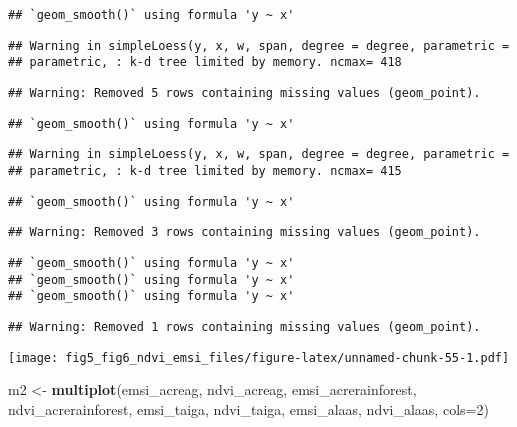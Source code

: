 \documentclass[
]{article}
\newenvironment{Shaded}{\begin{snugshade}}{\end{snugshade}}
\newcommand{\DataTypeTok}[1]{\textcolor[rgb]{0.13,0.29,0.53}{#1}}
\newcommand{\DecValTok}[1]{\textcolor[rgb]{0.00,0.00,0.81}{#1}}
\newcommand{\KeywordTok}[1]{\textcolor[rgb]{0.13,0.29,0.53}{\textbf{#1}}}
\newcommand{\NormalTok}[1]{#1}
\newcommand{\StringTok}[1]{\textcolor[rgb]{0.31,0.60,0.02}{#1}}
\begin{document}
\begin{verbatim}
## `geom_smooth()` using formula 'y ~ x'
\end{verbatim}

\begin{verbatim}
## Warning in simpleLoess(y, x, w, span, degree = degree, parametric =
## parametric, : k-d tree limited by memory. ncmax= 418
\end{verbatim}

\begin{verbatim}
## Warning: Removed 5 rows containing missing values (geom_point).
\end{verbatim}

\begin{verbatim}
## `geom_smooth()` using formula 'y ~ x'
\end{verbatim}

\begin{verbatim}
## Warning in simpleLoess(y, x, w, span, degree = degree, parametric =
## parametric, : k-d tree limited by memory. ncmax= 415
\end{verbatim}

\begin{verbatim}
## `geom_smooth()` using formula 'y ~ x'
\end{verbatim}

\begin{verbatim}
## Warning: Removed 3 rows containing missing values (geom_point).
\end{verbatim}

\begin{verbatim}
## `geom_smooth()` using formula 'y ~ x'
## `geom_smooth()` using formula 'y ~ x'
## `geom_smooth()` using formula 'y ~ x'
\end{verbatim}

\begin{verbatim}
## Warning: Removed 1 rows containing missing values (geom_point).
\end{verbatim}

\texttt{[image: fig5\_fig6\_ndvi\_emsi\_files/figure-latex/unnamed-chunk-55-1.pdf]}

\begin{Shaded}
\begin{Highlighting}[]
\NormalTok{m2 <-}\StringTok{ }\KeywordTok{multiplot}\NormalTok{(emsi_acreag, ndvi_acreag, emsi_acrerainforest, ndvi_acrerainforest, emsi_taiga, ndvi_taiga, emsi_alaas, ndvi_alaas, }\DataTypeTok{cols=}\DecValTok{2}\NormalTok{)}
\end{Highlighting}
\end{Shaded}
\end{document}
